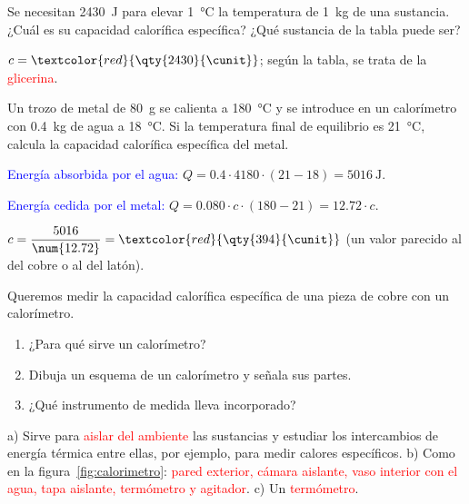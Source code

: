 \begin{exercise}
    Se necesitan \qty{2430}{\joule} para elevar \qty{1}{\degreeCelsius} la temperatura de \qty{1}{\kg} de una sustancia. ¿Cuál es su capacidad calorífica específica? ¿Qué sustancia de la tabla puede ser?
    \begin{solu}
        \(c = \textcolor{red}{\qty{2430}{\cunit}}\); según la tabla, se trata de la \textcolor{red}{glicerina}.
    \end{solu}
\end{exercise}

\begin{exercise}
    Un trozo de metal de \qty{80}{\gram} se calienta a \qty{180}{\degreeCelsius} y se introduce en un calorímetro con \qty{0.4}{\kg} de agua a \qty{18}{\degreeCelsius}. Si la temperatura final de equilibrio es \qty{21}{\degreeCelsius}, calcula la capacidad calorífica específica del metal.
    \begin{solu}
        \textcolor{blue}{Energía absorbida por el agua:} \(Q = \num{0.4} \cdot 4180 \cdot (21 - 18) = \qty{5016}{\joule}\).

        \textcolor{blue}{Energía cedida por el metal:} \(Q = \num{0.080} \cdot c \cdot (180 - 21) = \num{12.72} \cdot c\).

        \(c = \dfrac{5016}{\num{12.72}} = \textcolor{red}{\qty{394}{\cunit}}\) (un valor parecido al del cobre o al del latón).
    \end{solu}
\end{exercise}

\begin{exercise}
    Queremos medir la capacidad calorífica específica de una pieza de cobre con un calorímetro.
    \begin{enumerate}[label=\alph*)]
        \item ¿Para qué sirve un calorímetro?
        \item Dibuja un esquema de un calorímetro y señala sus partes.
        \item ¿Qué instrumento de medida lleva incorporado?
    \end{enumerate}
    \begin{solu}
        a) Sirve para \textcolor{red}{aislar del ambiente} las sustancias y estudiar los intercambios de energía térmica entre ellas, por ejemplo, para medir calores específicos.
        b) Como en la figura~\ref{fig:calorimetro}: \textcolor{red}{pared exterior, cámara aislante, vaso interior con el agua, tapa aislante, termómetro y agitador}.
        c) Un \textcolor{red}{termómetro}.
    \end{solu}
\end{exercise}

